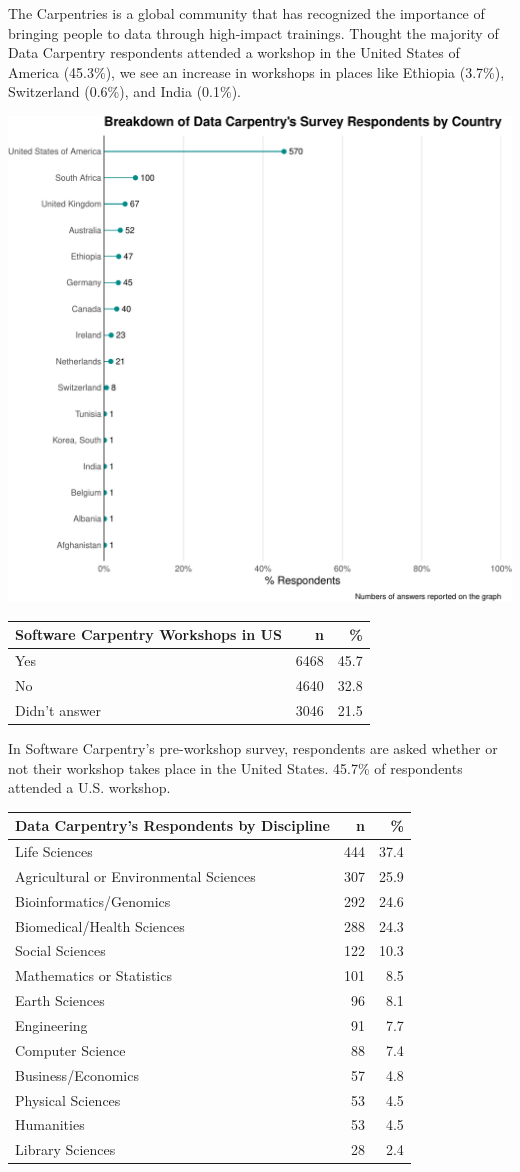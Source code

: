\documentclass[]{article}
\begin{document}
The Carpentries is a global community that has recognized the importance
of bringing people to data through high-impact trainings. Thought the
majority of Data Carpentry respondents attended a workshop in the United
States of America (45.3\%), we see an increase in workshops in places
like Ethiopia (3.7\%), Switzerland (0.6\%), and India (0.1\%).

\includegraphics[width=720]{figures/dc-country-workshop-plot-1}

\begin{longtable}[]{@{}lrr@{}}
\toprule
Software Carpentry Workshops in US & n & \%\tabularnewline
\midrule
\endhead
Yes & 6468 & 45.7\tabularnewline
No & 4640 & 32.8\tabularnewline
Didn't answer & 3046 & 21.5\tabularnewline
\bottomrule
\end{longtable}

In Software Carpentry's pre-workshop survey, respondents are asked
whether or not their workshop takes place in the United States. 45.7\%
of respondents attended a U.S. workshop.

\begin{longtable}[]{@{}lrr@{}}
\toprule
Data Carpentry's Respondents by Discipline & n & \%\tabularnewline
\midrule
\endhead
Life Sciences & 444 & 37.4\tabularnewline
Agricultural or Environmental Sciences & 307 & 25.9\tabularnewline
Bioinformatics/Genomics & 292 & 24.6\tabularnewline
Biomedical/Health Sciences & 288 & 24.3\tabularnewline
Social Sciences & 122 & 10.3\tabularnewline
Mathematics or Statistics & 101 & 8.5\tabularnewline
Earth Sciences & 96 & 8.1\tabularnewline
Engineering & 91 & 7.7\tabularnewline
Computer Science & 88 & 7.4\tabularnewline
Business/Economics & 57 & 4.8\tabularnewline
Physical Sciences & 53 & 4.5\tabularnewline
Humanities & 53 & 4.5\tabularnewline
Library Sciences & 28 & 2.4\tabularnewline
\bottomrule
\end{longtable}
\end{document}
